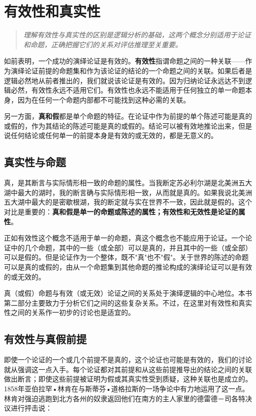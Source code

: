 \section{有效性和真实性}

\begin{quotation}
\textit{理解有效性与真实性的区别是逻辑分析的基础，这两个概念分别适用于论证和命题，正确把握它们的关系对评估推理至关重要。}
\end{quotation}

如前表明，一个成功的演绎论证是有效的。\textbf{有效性}指谓命题之间的一种关联——作为演绎论证前提的命题集和作为该论证的结论的一个命题之间的关联。如果后者是逻辑必然地从前者推出的，我们就说该论证是有效的。因为归纳论证永远达不到逻辑必然，有效性永远不适用它们。有效性也永远不能适用于任何独立的单一命题本身，因为在任何一个命题内部都不可能找到这种必需的关联。

另一方面，\textbf{真和假}都是单个命题的特征。在论证中作为前提的单个陈述可能是真的或假的，作为其结论的陈述可能是真的或假的。结论可以被有效地推论出来，但是说任何结论或任何单一的前提本身是有效的或无效的，都是无意义的。

\subsection{真实性与命题}

真，是其断言与实际情形相一致的命题的属性。当我断定苏必利尔湖是北美洲五大湖中最大的湖时，我的断言确与实际情形相一致，从而就是真的。如果我说北美洲五大湖中最大的是密歇根湖，我的断定就与实在世界不一致，因此就是假的。这个对比是重要的：\textbf{真和假是单一的命题或陈述的属性；有效性和无效性是论证的属性}。

正如有效性这个概念不适用于单一的命题，真这个概念也不能应用于论证。一个论证中的几个命题，其中的一些（或全部）可以是真的，并且其中的一些（或全部）可以是假的。但是论证作为一个整体，既不"真"也不"假"。关于世界的陈述的命题可以是真的或假的，由从一个命题集到其他命题的推论构成的演绎论证可以是有效的或无效的。

真（或假）命题与有效（或无效）论证之间的关系处于演绎逻辑的中心地位。本书第二部分主要致力于分析它们之间的这些复杂关系。不过，在这里对有效性和真实性之间的关系作一初步的讨论也是适宜的。

\subsection{有效性与真假前提}

即使一个论证的一个或几个前提不是真的，这个论证也可能是有效的，我们的讨论就从强调这一点入手。每个论证都对其前提和从这些前提推导出的结论之间的关联做出断言；即使这些前提被证明为假或其真实性受到质疑，这种关联也是成立的。1858年亚伯拉罕•林肯在与斯蒂芬•道格拉斯的一场争论中有力地运用了这一点。林肯对强迫逃跑到北方各州的奴隶返回他们在南方的主人家里的德雷德－司各特决议进行抨击说：

